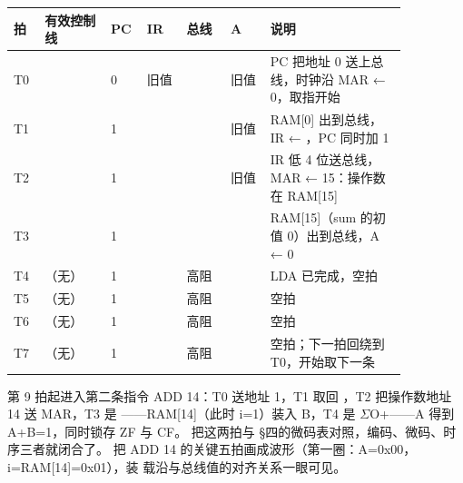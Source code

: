 \begin{longtable}{L{0.06\linewidth}L{0.15\linewidth}L{0.06\linewidth}L{0.09\linewidth}L{0.10\linewidth}L{0.09\linewidth}L{0.31\linewidth}}
\toprule
拍 & 有效控制线 & PC & IR & 总线 & A & 说明 \\
\midrule
T0 &  & 0 & 旧值 &  & 旧值 & PC 把地址 0 送上总线，时钟沿 MAR ← 0，取指开始 \\
T1 &  & 1 &  &  & 旧值 & RAM[0] 出到总线，IR ← ，PC 同时加 1 \\
T2 &  & 1 &  &  & 旧值 & IR 低 4 位送总线，MAR ← 15：操作数在 RAM[15] \\
T3 &  & 1 &  &  &  & RAM[15]（sum 的初值 0）出到总线，A ← 0 \\
T4 & （无） & 1 &  & 高阻 &  & LDA 已完成，空拍 \\
T5 & （无） & 1 &  & 高阻 &  & 空拍 \\
T6 & （无） & 1 &  & 高阻 &  & 空拍 \\
T7 & （无） & 1 &  & 高阻 &  & 空拍；下一拍回绕到 T0，开始取下一条 \\
\bottomrule
\end{longtable}

第 9 拍起进入第二条指令 ADD 14：T0 送地址 1，T1 取回 ，T2 把操作数地址 14 送 MAR，T3 是 ——RAM[14]（此时 i=1）装入 B，T4 是 $\Sigma$O+——A 得到 A+B=1，同时锁存 ZF 与 CF。
把这两拍与 §四的微码表对照，编码、微码、时序三者就闭合了。
把 ADD 14 的关键五拍画成波形（第一圈：A=0x00，i=RAM[14]=0x01），装
载沿与总线值的对齐关系一眼可见。

